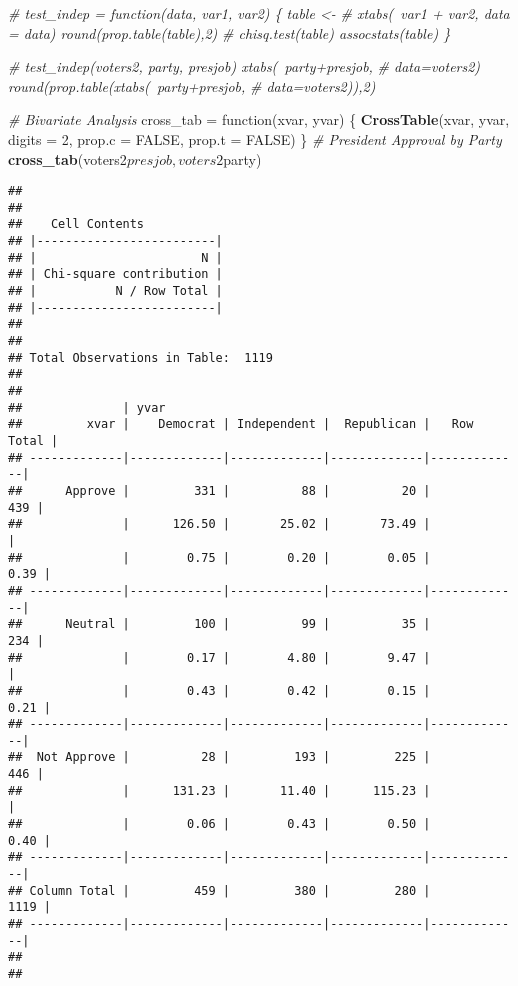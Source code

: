 \documentclass[]{article}
\newenvironment{Shaded}{\begin{snugshade}}{\end{snugshade}}
\newcommand{\KeywordTok}[1]{\textcolor[rgb]{0.13,0.29,0.53}{\textbf{{#1}}}}
\newcommand{\DataTypeTok}[1]{\textcolor[rgb]{0.13,0.29,0.53}{{#1}}}
\newcommand{\DecValTok}[1]{\textcolor[rgb]{0.00,0.00,0.81}{{#1}}}
\newcommand{\StringTok}[1]{\textcolor[rgb]{0.31,0.60,0.02}{{#1}}}
\newcommand{\CommentTok}[1]{\textcolor[rgb]{0.56,0.35,0.01}{\textit{{#1}}}}
\newcommand{\OtherTok}[1]{\textcolor[rgb]{0.56,0.35,0.01}{{#1}}}
\newcommand{\NormalTok}[1]{{#1}}
\begin{document}
\begin{Shaded}
\begin{Highlighting}[]
\CommentTok{# test_indep = function(data, var1, var2) \{ table <-}
\CommentTok{# xtabs(~var1 + var2, data = data) round(prop.table(table),2)}
\CommentTok{# chisq.test(table) assocstats(table) \}}

\CommentTok{# test_indep(voters2, party, presjob) xtabs(~party+presjob,}
\CommentTok{# data=voters2) round(prop.table(xtabs(~party+presjob,}
\CommentTok{# data=voters2)),2)}

\CommentTok{# Bivariate Analysis}
\NormalTok{cross_tab =}\StringTok{ }\NormalTok{function(xvar, yvar) \{}
    \KeywordTok{CrossTable}\NormalTok{(xvar, yvar, }\DataTypeTok{digits =} \DecValTok{2}\NormalTok{, }\DataTypeTok{prop.c =} \OtherTok{FALSE}\NormalTok{, }\DataTypeTok{prop.t =} \OtherTok{FALSE}\NormalTok{)}
\NormalTok{\}}
\CommentTok{# President Approval by Party}
\KeywordTok{cross_tab}\NormalTok{(voters2$presjob, voters2$party)}
\end{Highlighting}
\end{Shaded}

\begin{verbatim}
## 
##  
##    Cell Contents
## |-------------------------|
## |                       N |
## | Chi-square contribution |
## |           N / Row Total |
## |-------------------------|
## 
##  
## Total Observations in Table:  1119 
## 
##  
##              | yvar 
##         xvar |    Democrat | Independent |  Republican |   Row Total | 
## -------------|-------------|-------------|-------------|-------------|
##      Approve |         331 |          88 |          20 |         439 | 
##              |      126.50 |       25.02 |       73.49 |             | 
##              |        0.75 |        0.20 |        0.05 |        0.39 | 
## -------------|-------------|-------------|-------------|-------------|
##      Neutral |         100 |          99 |          35 |         234 | 
##              |        0.17 |        4.80 |        9.47 |             | 
##              |        0.43 |        0.42 |        0.15 |        0.21 | 
## -------------|-------------|-------------|-------------|-------------|
##  Not Approve |          28 |         193 |         225 |         446 | 
##              |      131.23 |       11.40 |      115.23 |             | 
##              |        0.06 |        0.43 |        0.50 |        0.40 | 
## -------------|-------------|-------------|-------------|-------------|
## Column Total |         459 |         380 |         280 |        1119 | 
## -------------|-------------|-------------|-------------|-------------|
## 
## 
\end{verbatim}
\end{document}
